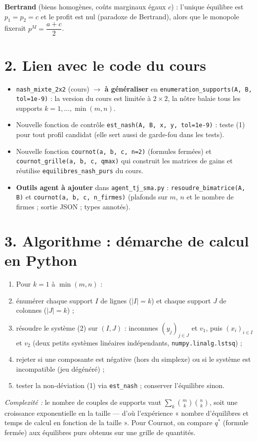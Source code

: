 \documentclass[11pt,a4paper]{article}
\begin{document}
\smallskip
\noindent\textbf{Bertrand} (biens homogènes, coûts marginaux égaux $c$) : l'unique équilibre
est $p_1=p_2=c$ et le profit est nul (paradoxe de Bertrand), alors que le monopole fixerait
$p^{M}=\dfrac{a+c}{2}$.

\section*{2. Lien avec le code du cours}
\begin{itemize}
  \item \texttt{nash\_mixte\_2x2} (cours) $\rightarrow$ \textbf{à généraliser} en
        \texttt{enumeration\_supports(A, B, tol=1e-9)} : la version du cours est limitée à
        $2\times2$, la nôtre balaie tous les supports $k=1,\dots,\min(m,n)$.
  \item Nouvelle fonction de contrôle \texttt{est\_nash(A, B, x, y, tol=1e-9)} : teste (1)
        pour tout profil candidat (elle sert aussi de garde-fou dans les tests).
  \item Nouvelle fonction \texttt{cournot(a, b, c, n=2)} (formules fermées) et
        \texttt{cournot\_grille(a, b, c, qmax)} qui construit les matrices de gains et
        réutilise \texttt{equilibres\_nash\_purs} du cours.
  \item \textbf{Outils agent à ajouter} dans \texttt{agent\_tj\_sma.py} :
        \texttt{resoudre\_bimatrice(A, B)} et \texttt{cournot(a, b, c, n\_firmes)}
        (plafonds sur $m$, $n$ et le nombre de firmes ; sortie JSON ; types annotés).
\end{itemize}

\section*{3. Algorithme : démarche de calcul en Python}
\begin{enumerate}[label=\arabic*.]
  \item Pour $k=1$ à $\min(m,n)$ :
  \item énumérer chaque support $I$ de lignes ($|I|=k$) et chaque support $J$ de colonnes
        ($|J|=k$) ;
  \item résoudre le système (2) sur $(I,J)$ : inconnues $(y_j)_{j\in J}$ et $v_1$, puis
        $(x_i)_{i\in I}$ et $v_2$ (deux petits systèmes linéaires indépendants,
        \texttt{numpy.linalg.lstsq}) ;
  \item rejeter si une composante est négative (hors du simplexe) ou si le système est
        incompatible (jeu dégénéré) ;
  \item tester la non-déviation (1) via \texttt{est\_nash} ; conserver l'équilibre sinon.
\end{enumerate}
\emph{Complexité :} le nombre de couples de supports vaut
$\sum_{k} \binom{m}{k}\binom{n}{k}$, soit une croissance exponentielle en la taille --- d'où
l'expérience « nombre d'équilibres et temps de calcul en fonction de la taille ». Pour Cournot,
on compare $q^{*}$ (formule fermée) aux équilibres purs obtenus sur une grille de quantités.
\end{document}
